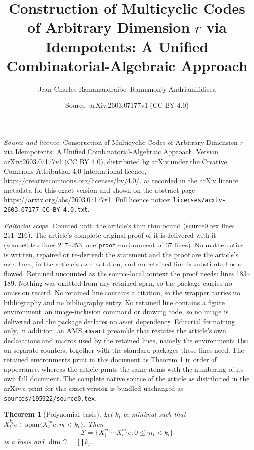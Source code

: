\documentclass[10pt,a4paper]{amsart}
\title{Construction of Multicyclic Codes of Arbitrary Dimension $r$ via Idempotents: A Unified Combinatorial-Algebraic Approach}
\author{Jean Charles Ramanandraibe, Ramamonjy Andriamifidisoa}
\date{Source: arXiv:2603.07177v1 (CC BY 4.0)}
\newtheorem{thm}{Theorem}
\begin{document}
\maketitle

\noindent\emph{Source and licence.} Construction of Multicyclic Codes of Arbitrary Dimension $r$ via Idempotents: A Unified Combinatorial-Algebraic Approach. Version arXiv:2603.07177v1 (CC BY 4.0), distributed by arXiv under the Creative Commons Attribution 4.0 International licence, http://creativecommons.org/licenses/by/4.0/, as recorded in the arXiv licence metadata for this exact version and shown on the abstract page https://arxiv.org/abs/2603.07177v1. Full licence notice: \texttt{licenses/arxiv-2603.07177-CC-BY-4.0.txt}.\par\smallskip

\noindent\textit{Editorial scope.} Counted unit: the article's thm thm:bound (source0.tex lines 211--216). The article's complete original proof of it is delivered with it (source0.tex lines 217--253, one \texttt{proof} environment of 37 lines). No mathematics is written, repaired or re-derived: the statement and the proof are the article's own lines, in the article's own notation, and no retained line is substituted or re-flowed.  Retained uncounted as the source-local context the proof needs: lines 183--189.  Nothing was omitted from any retained span, so the package carries no omission record.  No retained line contains a citation, so the wrapper carries no bibliography and no bibliography entry.  No retained line contains a figure environment, an image-inclusion command or drawing code, so no image is delivered and the package declares no asset dependency.  Editorial formatting only, in addition: an AMS \texttt{amsart} preamble that restates the article's own declarations and macros used by the retained lines, namely the environments \texttt{thm} on separate counters, together with the standard packages those lines need.  The retained environments print in this document as Theorem 1 in order of appearance, whereas the article prints the same items with the numbering of its own full document.  The complete native source of the article as distributed in the arXiv e-print for this exact version is bundled unchanged as \texttt{sources/195922/source0.tex}.
\begin{thm}[Polynomial basis]\label{thm:basis}
Let $k_t$ be minimal such that $X_t^{k_t} e \in \mathrm{span}\{X_t^m e : m < k_t\}$. Then
\[
\mathcal{B} = \{ X_1^{m_1}\cdots X_r^{m_r} e : 0\le m_t < k_t \}
\]
is a basis and $\dim C = \prod k_t$.
\end{thm}
\end{document}
